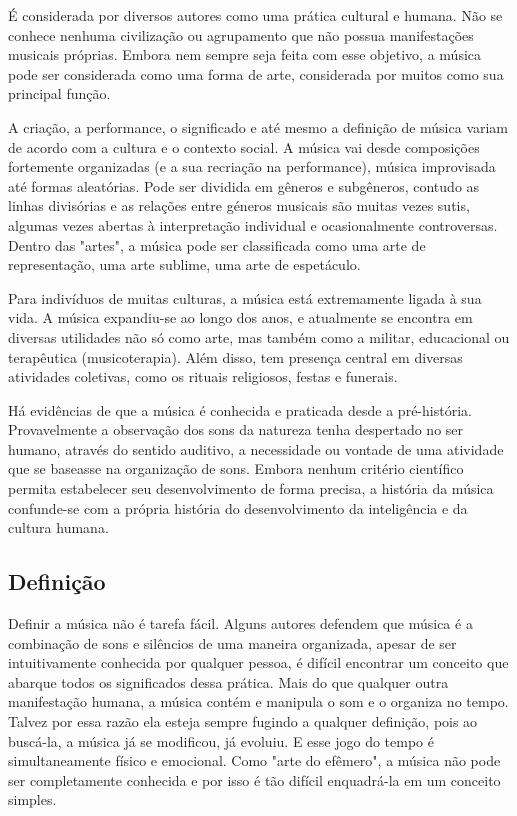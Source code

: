 \documentclass[a4paper,12pt]{article}
\begin{document}
É considerada por diversos autores como uma prática cultural e humana. Não se conhece nenhuma civilização ou agrupamento que não possua manifestações musicais próprias. Embora nem sempre seja feita com esse objetivo, a música pode ser considerada como uma forma de arte, considerada por muitos como sua principal função.

A criação, a performance, o significado e até mesmo a definição de música variam de acordo com a cultura e o contexto social. A música vai desde composições fortemente organizadas (e a sua recriação na performance), música improvisada até formas aleatórias. Pode ser dividida em gêneros e subgêneros, contudo as linhas divisórias e as relações entre géneros musicais são muitas vezes sutis, algumas vezes abertas à interpretação individual e ocasionalmente controversas. Dentro das "artes", a música pode ser classificada como uma arte de representação, uma arte sublime, uma arte de espetáculo.

Para indivíduos de muitas culturas, a música está extremamente ligada à sua vida. A música expandiu-se ao longo dos anos, e atualmente se encontra em diversas utilidades não só como arte, mas também como a militar, educacional ou terapêutica (musicoterapia). Além disso, tem presença central em diversas atividades coletivas, como os rituais religiosos, festas e funerais.

Há evidências de que a música é conhecida e praticada desde a pré-história. Provavelmente a observação dos sons da natureza tenha despertado no ser humano, através do sentido auditivo, a necessidade ou vontade de uma atividade que se baseasse na organização de sons. Embora nenhum critério científico permita estabelecer seu desenvolvimento de forma precisa, a história da música confunde-se com a própria história do desenvolvimento da inteligência e da cultura humana.

\subsection*{Definição}
Definir a música não é tarefa fácil. Alguns autores defendem que música é a combinação de sons e silêncios de uma maneira organizada, apesar de ser intuitivamente conhecida por qualquer pessoa, é difícil encontrar um conceito que abarque todos os significados dessa prática. Mais do que qualquer outra manifestação humana, a música contém e manipula o som e o organiza no tempo. Talvez por essa razão ela esteja sempre fugindo a qualquer definição, pois ao buscá-la, a música já se modificou, já evoluiu. E esse jogo do tempo é simultaneamente físico e emocional. Como "arte do efêmero", a música não pode ser completamente conhecida e por isso é tão difícil enquadrá-la em um conceito simples.
\end{document}
